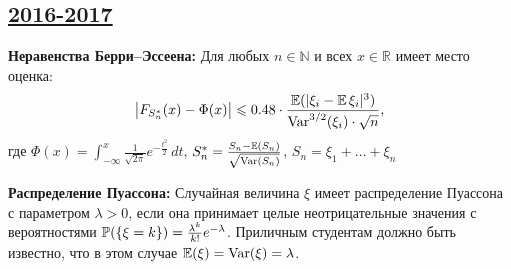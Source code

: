 \newpage
\subsection[2016-2017]{\hyperref[sec:sol_kr_02_2016_2017]{2016-2017}}
\label{sec:kr_02_2016_2017}

\textbf{Неравенства Берри–Эссеена:} Для любых $n \in \mathbb{N}$ и всех
$x \in \mathbb{R}$ имеет место оценка:
\[
\bigl|F_{S_n^{*}}(x) - \Phi(x)\bigr| \leq 0.48 \cdot \frac{\E(|\xi_i - \E\xi_i|^3)}{\Var^{3/2}(\xi_i)\cdot\sqrt{n}} \text{,}
\]
где $\Phi(x) = \int_{-\infty}^{x}\frac{1}{\sqrt{2\pi}}e^{-\frac{t^2}{2}}\,dt$, \; $S_n^* = \frac{S_n - \E(S_n)}{\sqrt{\Var(S_n)}}$, \; $S_n = \xi_1 + \ldots + \xi_n$

\textbf{Распределение Пуассона:} Случайная величина $\xi$ имеет распределение Пуассона
с параметром $\lambda > 0$,  если она принимает целые неотрицательные значения с
вероятностями $\P(\{\xi = k\}) = \frac{\lambda^k}{k!}e^{-\lambda}$. Приличным
студентам должно быть известно, что в этом случае $\E(\xi) = \Var(\xi) = \lambda$.

